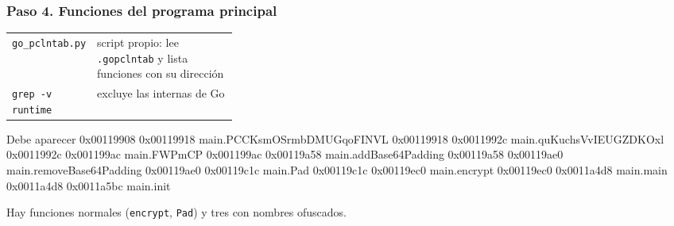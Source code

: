 \documentclass[11pt,a4paper]{article}
\begin{document}
\subsubsection*{Paso 4. Funciones del programa principal}
\begin{tcolorbox}[enhanced, breakable, colback=gray!3, colframe=gray!35, boxrule=0.3pt, arc=1pt, left=4pt, right=4pt, top=2pt, bottom=2pt, fonttitle=\sffamily\scriptsize\bfseries, coltitle=black!70, colbacktitle=gray!10, title={Qué hace cada parte}, attach title to upper, before skip=2pt, after skip=4pt, fontupper=\small]
\par{\renewcommand{\arraystretch}{1.12}\begin{tabularx}{\linewidth}{@{}>{\raggedright\arraybackslash}p{0.33\linewidth}>{\raggedright\arraybackslash}X@{}}
\texttt{go\_\allowbreak{}pclntab.py} & script propio: lee \texttt{.gopclntab} y lista funciones con su dirección \\
\texttt{grep -v runtime} & excluye las internas de Go \\
\end{tabularx}}
\end{tcolorbox}
\begin{salida}{Debe aparecer}
0x00119908 0x00119918 main.PCCKsmOSrmbDMUGqoFINVL
0x00119918 0x0011992c main.quKuchsVvIEUGZDKOxl
0x0011992c 0x001199ac main.FWPmCP
0x001199ac 0x00119a58 main.addBase64Padding
0x00119a58 0x00119ae0 main.removeBase64Padding
0x00119ae0 0x00119c1c main.Pad
0x00119c1c 0x00119ec0 main.encrypt
0x00119ec0 0x0011a4d8 main.main
0x0011a4d8 0x0011a5bc main.init
\end{salida}
\begin{nota}Hay funciones normales (\texttt{encrypt}, \texttt{Pad}) y tres con nombres ofuscados.\end{nota}
\end{document}
